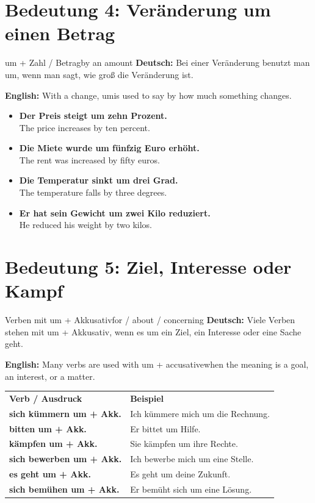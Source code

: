 \documentclass[a4paper,11pt]{article}
\newcommand{\GermanText}[1]{\textbf{Deutsch: }#1\par}
\newcommand{\EnglishText}[1]{{\small\color{SoftGray}\textbf{English: }#1\par}}
\newcommand{\ExampleItem}[2]{\item \textbf{#1}\\{\small\color{SoftGray}#2}}
\begin{document}
\section{Bedeutung 4: Veränderung um einen Betrag}

\begin{grammarentry}{um + Zahl / Betrag}{by an amount}
\GermanText{Bei einer Veränderung benutzt man \glqq um\grqq, wenn man sagt, wie groß die Veränderung ist.}
\EnglishText{With a change, \glqq um\grqq is used to say by how much something changes.}
\end{grammarentry}

\begin{exbox}
\begin{itemize}
    \ExampleItem{Der Preis steigt um zehn Prozent.}{The price increases by ten percent.}
    \ExampleItem{Die Miete wurde um fünfzig Euro erhöht.}{The rent was increased by fifty euros.}
    \ExampleItem{Die Temperatur sinkt um drei Grad.}{The temperature falls by three degrees.}
    \ExampleItem{Er hat sein Gewicht um zwei Kilo reduziert.}{He reduced his weight by two kilos.}
\end{itemize}
\end{exbox}

\section{Bedeutung 5: Ziel, Interesse oder Kampf}

\begin{grammarentry}{Verben mit um + Akkusativ}{for / about / concerning}
\GermanText{Viele Verben stehen mit \glqq um + Akkusativ\grqq, wenn es um ein Ziel, ein Interesse oder eine Sache geht.}
\EnglishText{Many verbs are used with \glqq um + accusative\grqq when the meaning is a goal, an interest, or a matter.}
\end{grammarentry}

\begin{tabularx}{\textwidth}{>{\bfseries}p{}X}
\rowcolor{HeaderBlueDark}
\color{white}\textbf{Verb / Ausdruck} & \color{white}\textbf{Beispiel} \\
sich kümmern um + Akk. & Ich kümmere mich um die Rechnung. \\
bitten um + Akk. & Er bittet um Hilfe. \\
kämpfen um + Akk. & Sie kämpfen um ihre Rechte. \\
sich bewerben um + Akk. & Ich bewerbe mich um eine Stelle. \\
es geht um + Akk. & Es geht um deine Zukunft. \\
sich bemühen um + Akk. & Er bemüht sich um eine Lösung. \\
\end{tabularx}
\end{document}
